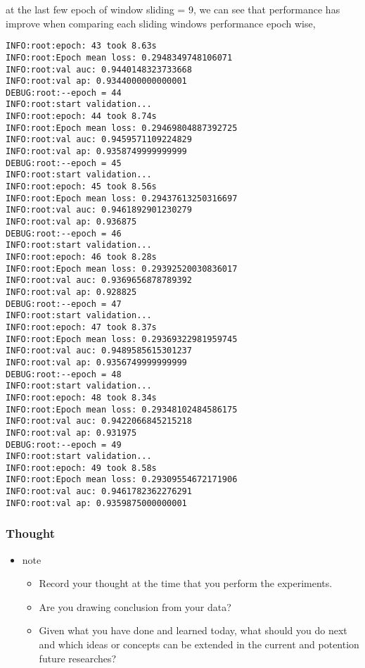 \documentclass[11pt]{article}
\begin{document}
at the last few epoch of window sliding = 9, we can see that performance has improve when comparing each sliding windows performance epoch wise,
\begin{verbatim}
INFO:root:epoch: 43 took 8.63s
INFO:root:Epoch mean loss: 0.2948349748106071
INFO:root:val auc: 0.9440148323733668
INFO:root:val ap: 0.9344000000000001
DEBUG:root:--epoch = 44
INFO:root:start validation...
INFO:root:epoch: 44 took 8.74s
INFO:root:Epoch mean loss: 0.29469804887392725
INFO:root:val auc: 0.9459571109224829
INFO:root:val ap: 0.9358749999999999
DEBUG:root:--epoch = 45
INFO:root:start validation...
INFO:root:epoch: 45 took 8.56s
INFO:root:Epoch mean loss: 0.29437613250316697
INFO:root:val auc: 0.9461892901230279
INFO:root:val ap: 0.936875
DEBUG:root:--epoch = 46
INFO:root:start validation...
INFO:root:epoch: 46 took 8.28s
INFO:root:Epoch mean loss: 0.29392520030836017
INFO:root:val auc: 0.9369656878789392
INFO:root:val ap: 0.928825
DEBUG:root:--epoch = 47
INFO:root:start validation...
INFO:root:epoch: 47 took 8.37s
INFO:root:Epoch mean loss: 0.29369322981959745
INFO:root:val auc: 0.9489585615301237
INFO:root:val ap: 0.9356749999999999
DEBUG:root:--epoch = 48
INFO:root:start validation...
INFO:root:epoch: 48 took 8.34s
INFO:root:Epoch mean loss: 0.29348102484586175
INFO:root:val auc: 0.9422066845215218
INFO:root:val ap: 0.931975
DEBUG:root:--epoch = 49
INFO:root:start validation...
INFO:root:epoch: 49 took 8.58s
INFO:root:Epoch mean loss: 0.29309554672171906
INFO:root:val auc: 0.9461782362276291
INFO:root:val ap: 0.9359875000000001

\end{verbatim}

\subsubsection{Thought}
\label{sec:org0377aa7}
\begin{itemize}
\item note
\begin{itemize}
\item Record your thought at the time that you perform the experiments.
\item Are you drawing conclusion from your data?
\item Given what you have done and learned today, what should you do next and which ideas or concepts can be extended in the current and potention future researches?
\end{itemize}
\end{itemize}
\end{document}
